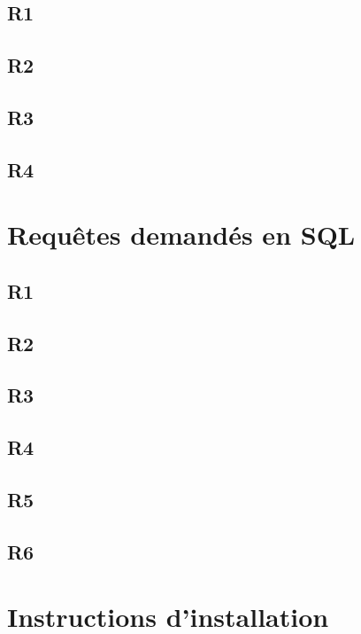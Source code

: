 \documentclass[11pt]{article}
\begin{document}
\subsection{R1}

\subsection{R2}

\subsection{R3}

\subsection{R4}

\section{Requêtes demandés en SQL}
\subsection{R1}

\subsection{R2}

\subsection{R3}

\subsection{R4}

\subsection{R5}

\subsection{R6}



\section{Instructions d'installation}
\end{document}
